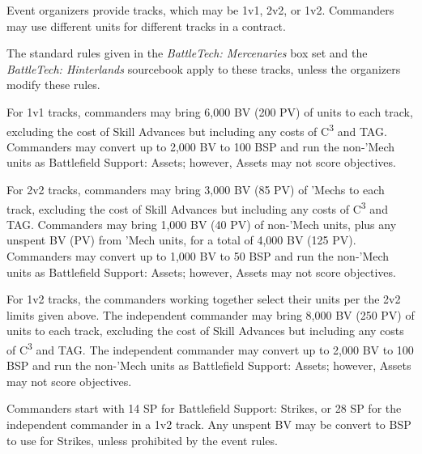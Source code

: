 Event organizers provide tracks, which may be 1v1, 2v2, or 1v2.
Commanders may use different units for different tracks in a contract.

The standard rules given in the \emph{BattleTech: Mercenaries} box set and the \emph{BattleTech: Hinterlands} sourcebook apply to these tracks, unless the organizers modify these rules.

For 1v1 tracks, commanders may bring 6,000 BV (200 PV) of units to each track, excluding the cost of Skill Advances but including any costs of C\textsuperscript{3} and TAG.
Commanders may convert up to 2,000 BV to 100 BSP and run the non-'Mech units as Battlefield Support: Assets; however, Assets may not score objectives.

For 2v2 tracks, commanders may bring 3,000 BV (85 PV) of 'Mechs to each track, excluding the cost of Skill Advances but including any costs of C\textsuperscript{3} and TAG.
Commanders may bring 1,000 BV (40 PV) of non-'Mech units, plus any unspent BV (PV) from 'Mech units, for a total of 4,000 BV (125 PV).
Commanders may convert up to 1,000 BV to 50 BSP and run the non-'Mech units as Battlefield Support: Assets; however, Assets may not score objectives.

For 1v2 tracks, the commanders working together select their units per the 2v2 limits given above.
The independent commander may bring 8,000 BV (250 PV) of units to each track, excluding the cost of Skill Advances but including any costs of C\textsuperscript{3} and TAG.
The independent commander may convert up to 2,000 BV to 100 BSP and run the non-'Mech units as Battlefield Support: Assets; however, Assets may not score objectives.

Commanders start with 14 SP for Battlefield Support: Strikes, or 28 SP for the independent commander in a 1v2 track.
Any unspent BV may be convert to BSP to use for Strikes, unless prohibited by the event rules.
